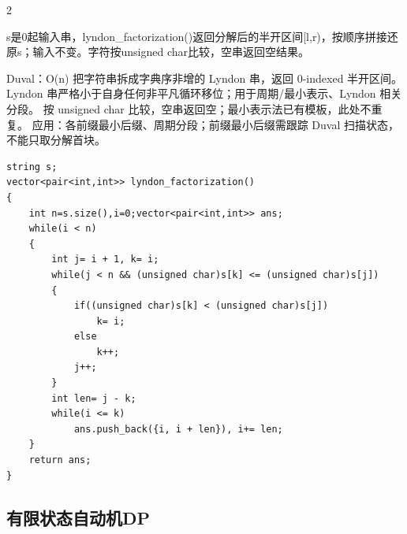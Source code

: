 \documentclass[UTF8,fontset=fandol,a4paper,twoside]{ctexart}
\newcommand{\note}[1]{{\fontsize{10}{12}\selectfont #1\par}}
\begin{document}
\begin{multicols}{2}
\note{s是0起输入串，lyndon\_factorization(\allowbreak{})\allowbreak{}返回分解后的半开区间[\allowbreak{}l,\allowbreak{}r)\allowbreak{}，按顺序拼接还原s；输入不变。字符按unsigned char比较，空串返回空结果。}
\note{Duval：O(\allowbreak{}n)\allowbreak{} 把字符串拆成字典序非增的 Lyndon 串，返回 0-\allowbreak{}indexed 半开区间。 Lyndon 串严格小于自身任何非平凡循环移位；用于周期/\allowbreak{}最小表示、Lyndon 相关分段。 按 unsigned char 比较，空串返回空；最小表示法已有模板，此处不重复。 应用：各前缀最小后缀、周期分段；前缀最小后缀需跟踪 Duval 扫描状态，不能只取分解首块。}
\begin{lstlisting}
string s;
vector<pair<int,int>> lyndon_factorization()
{
    int n=s.size(),i=0;vector<pair<int,int>> ans;
    while(i < n)
    {
        int j= i + 1, k= i;
        while(j < n && (unsigned char)s[k] <= (unsigned char)s[j])
        {
            if((unsigned char)s[k] < (unsigned char)s[j])
                k= i;
            else
                k++;
            j++;
        }
        int len= j - k;
        while(i <= k)
            ans.push_back({i, i + len}), i+= len;
    }
    return ans;
}
\end{lstlisting}
\subsection{有限状态自动机DP}


\end{multicols}
\end{document}
